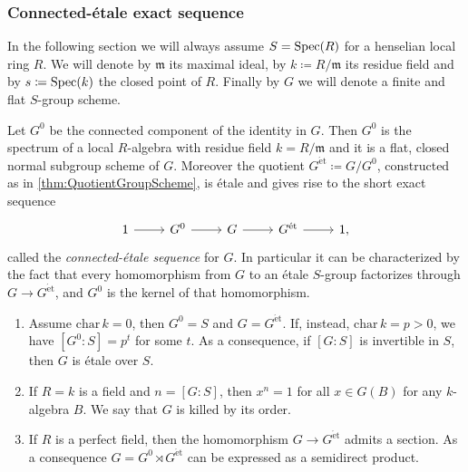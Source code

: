 \subsubsection{Connected-étale exact sequence}
In the following section we will always assume 
$S = \operatorname{Spec}(R)$	for a henselian local ring $R$.
We will denote by $\mathfrak{m}$ its maximal ideal, by $k \coloneqq R/\mathfrak{m}$
its residue field and by $s \coloneqq \operatorname{Spec}(k)$ the closed point of $R$.
Finally by $G$ we will denote a finite and flat $S$-group scheme.

\begin{thm}\label{thm:ConnectedEtaleSequenceGS}
	Let $G^0$ be the connected component of the identity in $G$.
	Then $G^0$ is the spectrum of a local $R$-algebra with residue field $k = R/\mathfrak{m}$
	and it is a flat, closed normal subgroup scheme of $G$.
	Moreover the quotient $G^{\mathrm{\acute et}} \coloneqq G/G^0$,
	constructed as in \cref{thm:QuotientGroupScheme},
	is étale and gives rise to the short exact sequence
	\begin{equation*}
	\begin{tikzcd}
		1 \arrow[r, "", rightarrow] &
		G^0 \arrow[r, "", rightarrow] &
		G \arrow[r, "", rightarrow] &
		G^{\mathrm{\acute et}} \arrow[r, "", rightarrow] &
		1
	,\end{tikzcd}
	\end{equation*}
	called the \emph{connected-étale sequence} for $G$.
	In particular it can be characterized by the fact that every homomorphism
	from $G$ to an étale $S$-group factorizes through $G \to G^{\mathrm{\acute et}}$,
	and $G^0$ is the kernel of that homomorphism.
\end{thm}


\begin{prop}\label{prop:PropertiesConnectedEtale}
\leavevmode\vspace{-.2\baselineskip}
\begin{enumerate}
	\item Assume $\mathrm{char}\, k = 0$, then $G^0 = S$
		and $G = G^{\mathrm{\acute et}}$.
		If, instead, $\mathrm{char}\, k = p > 0$, we have
		$[G^0:S] = p^t$ for some $t$.
		As a consequence, if $[G:S]$ is invertible in $S$, then
		$G$ is étale over $S$.

	\item If $R = k$ is a field and $n = [G:S]$, then $x^n = 1$
		for all $x \in G(B)$ for any $k$-algebra $B$.
		We say that $G$ is killed by its order.

	\item If $R$ is a perfect field, then the homomorphism
		$G \to  G^{\mathrm{\acute et}}$ admits a section. 
		As a consequence $G = G^0 \rtimes G^{\mathrm{\acute et}}$
		can be expressed as a semidirect product.
\end{enumerate}
\end{prop}


